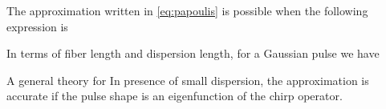 \documentclass[10pt, lettersize, journal, onecolumn]{IEEEtran}
\begin{document}
	The approximation written in \ref{eq:papoulis} is possible when the following expression is 
	
	In terms of fiber length and dispersion length, for a Gaussian pulse we have
	
	
	
	A general theory for 
	In presence of small dispersion, the approximation is accurate if the pulse shape is an eigenfunction of the chirp operator.
	
	
	
	
	\printbibliography
\end{document}
